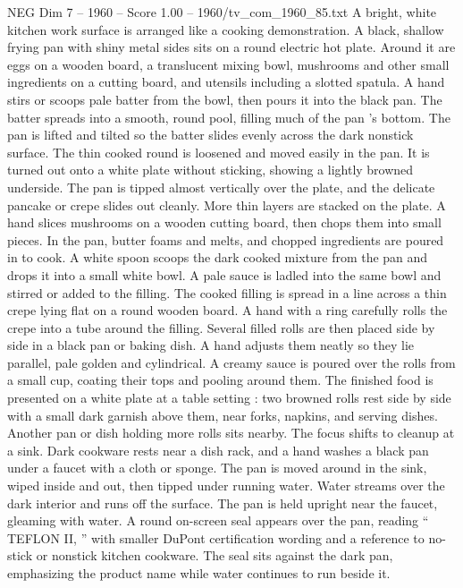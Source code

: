 \begin{textsample}{NEG Dim 7 – 1960 – Score 1.00 – 1960/tv\_com\_1960\_85.txt}  \label{ex:f7_neg_077}
A bright, white kitchen work surface is arranged like a cooking demonstration.
A black, shallow frying pan with shiny metal sides sits on a round electric hot plate.
Around it are eggs on a wooden board, a translucent mixing bowl, mushrooms and other small ingredients on a cutting board, and utensils including a slotted spatula.
A hand stirs or scoops pale batter from the bowl, then pours it into the black pan.
The batter spreads into a smooth, round pool, filling much of the pan ’s bottom.
The pan is lifted and tilted so the batter slides evenly across the dark nonstick surface.
The thin cooked round is loosened and moved easily in the pan.
It is turned out onto a white plate without sticking, showing a lightly browned underside.
The pan is tipped almost vertically over the plate, and the delicate pancake or crepe slides out cleanly.
More thin layers are stacked on the plate.
A hand slices mushrooms on a wooden cutting board, then chops them into small pieces.
In the pan, butter foams and melts, and chopped ingredients are poured in to cook.
A white spoon scoops the dark cooked mixture from the pan and drops it into a small white bowl.
A pale sauce is ladled into the same bowl and stirred or added to the filling.
The cooked filling is spread in a line across a thin crepe lying flat on a round wooden board.
A hand with a ring carefully rolls the crepe into a tube around the filling.
Several filled rolls are then placed side by side in a black pan or baking dish.
A hand adjusts them neatly so they lie parallel, pale golden and cylindrical.
A creamy sauce is poured over the rolls from a small cup, coating their tops and pooling around them.
The finished food is presented on a white plate at a table setting : two browned rolls rest side by side with a small dark garnish above them, near forks, napkins, and serving dishes.
Another pan or dish holding more rolls sits nearby.
The focus shifts to cleanup at a sink.
Dark cookware rests near a dish rack, and a hand washes a black pan under a faucet with a cloth or sponge.
The pan is moved around in the sink, wiped inside and out, then tipped under running water.
Water streams over the dark interior and runs off the surface.
The pan is held upright near the faucet, gleaming with water.
A round on-screen seal appears over the pan, reading “ TEFLON II, ” with smaller DuPont certification wording and a reference to no-stick or nonstick kitchen cookware.
The seal sits against the dark pan, emphasizing the product name while water continues to run beside it.

\end{textsample}
